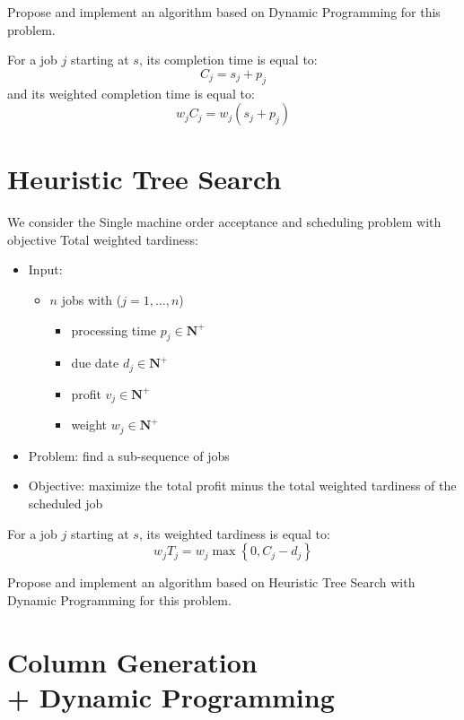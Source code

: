 \documentclass[a4paper,twocolumn]{article}
\newcommand{\N}{\mathbf{N}}
\begin{document}
Propose and implement an algorithm based on Dynamic Programming for this problem.

For a job $j$ starting at $s$, its completion time is equal to:
\begin{displaymath}
  C_j = s_j + p_j
\end{displaymath}
and its weighted completion time is equal to:
\begin{displaymath}
  w_j C_j = w_j (s_j + p_j)
\end{displaymath}

\section{Heuristic Tree Search}

We consider the Single machine order acceptance and scheduling problem with objective Total weighted tardiness:
\begin{itemize}
  \item Input:
    \begin{itemize}
      \item $n$ jobs with ($j = 1, \dots, n$)
        \begin{itemize}
          \item processing time $p_j \in \N^+$
          \item due date $d_j \in \N^+$
          \item profit $v_j \in \N^+$
          \item weight $w_j \in \N^+$
        \end{itemize}
    \end{itemize}
  \item Problem: find a sub-sequence of jobs
  \item Objective: maximize the total profit minus the total weighted tardiness of the scheduled job
\end{itemize}

For a job $j$ starting at $s$, its weighted tardiness is equal to:
\begin{displaymath}
  w_j T_j = w_j \max \left\{ 0, C_j - d_j \right\}
\end{displaymath}

Propose and implement an algorithm based on Heuristic Tree Search with Dynamic Programming for this problem.

\section{Column Generation \\ + Dynamic Programming}
\end{document}
